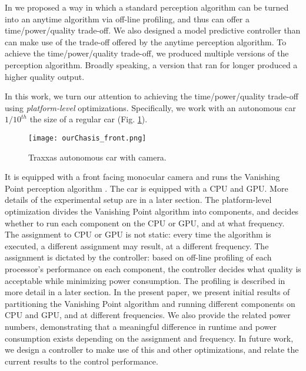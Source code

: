 In \cite{RTSS15} we proposed a way in which a standard perception algorithm can be turned into an anytime algorithm via off-line profiling, and thus can offer a time/power/quality trade-off.
We also designed a model predictive controller than can make use of the trade-off offered by the anytime perception algorithm.
To achieve the time/power/quality trade-off, we produced multiple versions of the perception algorithm.
Broadly speaking, a version that ran for longer produced a higher quality output. 

In this work, we turn our attention to achieving the time/power/quality trade-off using \emph{platform-level} optimizations.
Specifically, we work with an autonomous car $1/10^{th}$ the size of a regular car (Fig. \ref{fig:traxxas}).
\begin{figure}[t]
	\centering
	\texttt{[image: ourChasis\_front.png]}
	\caption{Traxxas autonomous car with camera.}
		\label{fig:traxxas}
\end{figure}  
It is equipped with a front facing monocular camera and runs the Vanishing Point perception algorithm \cite{VP1}. 
The car is equipped with a CPU and GPU. More details of the experimental setup are in a later section.
The platform-level optimization divides the Vanishing Point algorithm into components, and decides whether to run each component on the CPU or GPU, and at what frequency.
The assignment to CPU or GPU is not static: every time the algorithm is executed, a different assignment may result, at a different frequency.
The assignment is dictated by the controller: based on off-line profiling of each processor's performance on each component, the controller decides what quality is acceptable while minimizing power consumption. The profiling is described in more detail in a later section.
In the present paper, we present initial results of partitioning the Vanishing Point algorithm and running different components on CPU and GPU, and at different frequencies.
We also provide the related power numbers, demonstrating that a meaningful difference in runtime and power consumption exists depending on the assignment and frequency.
In future work, we design a controller to make use of this and other optimizations, and relate the current results to the control performance.
%
%
%
